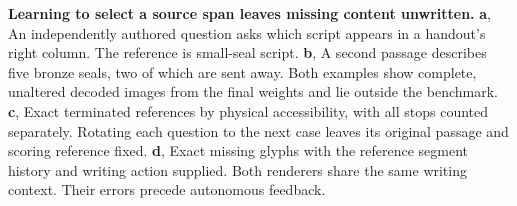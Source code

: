 \textbf{Learning to select a source span leaves missing content unwritten.} \textbf{a}, An independently authored question asks which script appears in a handout's right column. The reference is small-seal script. \textbf{b}, A second passage describes five bronze seals, two of which are sent away. Both examples show complete, unaltered decoded images from the final weights and lie outside the benchmark. \textbf{c}, Exact terminated references by physical accessibility, with all stops counted separately. Rotating each question to the next case leaves its original passage and scoring reference fixed. \textbf{d}, Exact missing glyphs with the reference segment history and writing action supplied. Both renderers share the same writing context. Their errors precede autonomous feedback.
